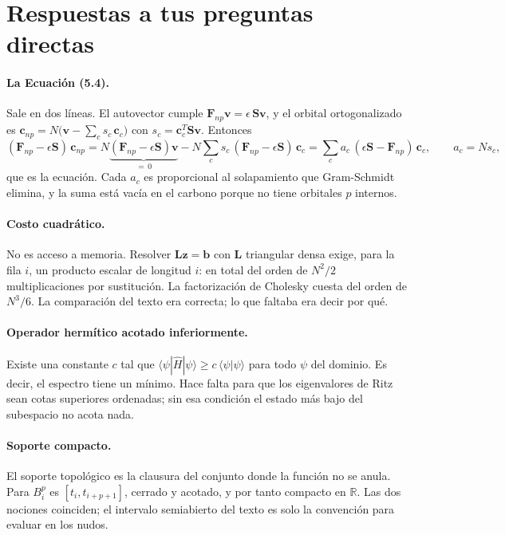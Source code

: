 \documentclass[11pt,a4paper]{article}
\begin{document}
\section{Respuestas a tus preguntas directas}
\label{sec:respuestas}

\paragraph{La Ecuación (5.4).} Sale en dos líneas. El autovector cumple
$\bm F_{np}\bm v=\epsilon\,\bm S\bm v$, y el orbital ortogonalizado es
$\bm c_{np}=N\big(\bm v-\sum_c s_c\,\bm c_c\big)$ con $s_c=\bm c_c^{T}\bm S\bm v$. Entonces
\[
(\bm F_{np}-\epsilon\bm S)\,\bm c_{np}
=N\underbrace{(\bm F_{np}-\epsilon\bm S)\bm v}_{=\,0}-N\sum_c s_c\,(\bm F_{np}-\epsilon\bm S)\,\bm c_c
=\sum_c a_c\,(\epsilon\bm S-\bm F_{np})\,\bm c_c ,\qquad a_c=N s_c ,
\]
que es la ecuación. Cada $a_c$ es proporcional al solapamiento que Gram-Schmidt elimina, y la suma
está vacía en el carbono porque no tiene orbitales $p$ internos.

\paragraph{Costo cuadrático.} No es acceso a memoria. Resolver $\bm L\bm z=\bm b$ con $\bm L$
triangular densa exige, para la fila $i$, un producto escalar de longitud $i$: en total del orden
de $N^2/2$ multiplicaciones por sustitución. La factorización de Cholesky cuesta del orden de
$N^3/6$. La comparación del texto era correcta; lo que faltaba era decir por qué.

\paragraph{Operador hermítico acotado inferiormente.} Existe una constante $c$ tal que
$\langle\psi|\hat H|\psi\rangle\ge c\,\langle\psi|\psi\rangle$ para todo $\psi$ del dominio. Es
decir, el espectro tiene un mínimo. Hace falta para que los eigenvalores de Ritz sean cotas
superiores ordenadas; sin esa condición el estado más bajo del subespacio no acota nada.

\paragraph{Soporte compacto.} El soporte topológico es la clausura del conjunto donde la función
no se anula. Para $B_i^p$ es $[t_i,t_{i+p+1}]$, cerrado y acotado, y por tanto compacto en
$\mathbb R$. Las dos nociones coinciden; el intervalo semiabierto del texto es solo la convención
para evaluar en los nudos.
\end{document}
